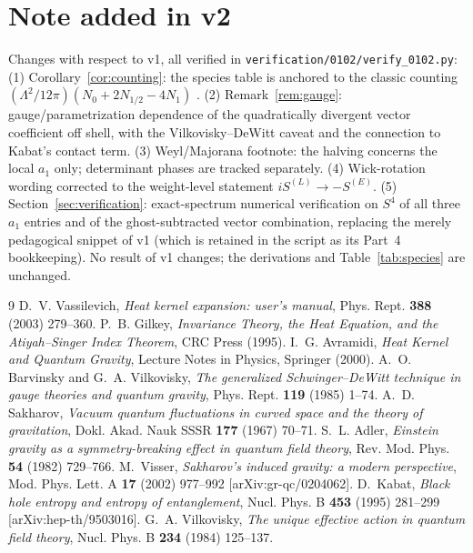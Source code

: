 \documentclass[11pt]{article}
\begin{document}
\section*{Note added in v2}
Changes with respect to v1, all verified in
\texttt{verification/0102/verify\_0102.py}:
(1) Corollary~\ref{cor:counting}: the species table is anchored to the classic
counting $(\Lambda^2/12\pi)(N_0 + 2N_{1/2} - 4N_1)$ \cite{Adler,Visser,Kabat}.
(2) Remark~\ref{rem:gauge}: gauge/parametrization dependence of the
quadratically divergent vector coefficient off shell, with the
Vilkovisky--DeWitt caveat and the connection to Kabat's contact term.
(3) Weyl/Majorana footnote: the halving concerns the local $a_1$ only;
determinant phases are tracked separately.
(4) Wick-rotation wording corrected to the weight-level statement
$iS^{(L)} \to -S^{(E)}$.
(5) Section~\ref{sec:verification}: exact-spectrum numerical verification on $S^4$ of
all three $a_1$ entries and of the ghost-subtracted vector combination,
replacing the merely pedagogical snippet of v1 (which is retained in the
script as its Part~4 bookkeeping). No result of v1 changes; the derivations
and Table~\ref{tab:species} are unchanged.

\begin{thebibliography}{9}
 D.~V. Vassilevich, \emph{Heat kernel expansion: user's
manual}, Phys. Rept. \textbf{388} (2003) 279--360.
 P.~B. Gilkey, \emph{Invariance Theory, the Heat Equation,
and the Atiyah--Singer Index Theorem}, CRC Press (1995).
 I.~G. Avramidi, \emph{Heat Kernel and Quantum Gravity},
Lecture Notes in Physics, Springer (2000).
 A.~O. Barvinsky and G.~A. Vilkovisky, \emph{The generalized
Schwinger--DeWitt technique in gauge theories and quantum gravity}, Phys.
Rept. \textbf{119} (1985) 1--74.
 A.~D. Sakharov, \emph{Vacuum quantum fluctuations in
curved space and the theory of gravitation}, Dokl. Akad. Nauk SSSR
\textbf{177} (1967) 70--71.
 S.~L. Adler, \emph{Einstein gravity as a symmetry-breaking
effect in quantum field theory}, Rev. Mod. Phys. \textbf{54} (1982) 729--766.
 M.~Visser, \emph{Sakharov's induced gravity: a modern
perspective}, Mod. Phys. Lett. A \textbf{17} (2002) 977--992
[arXiv:gr-qc/0204062].
 D.~Kabat, \emph{Black hole entropy and entropy of
entanglement}, Nucl. Phys. B \textbf{453} (1995) 281--299
[arXiv:hep-th/9503016].
 G.~A. Vilkovisky, \emph{The unique effective action in quantum
field theory}, Nucl. Phys. B \textbf{234} (1984) 125--137.
\end{thebibliography}
\end{document}
